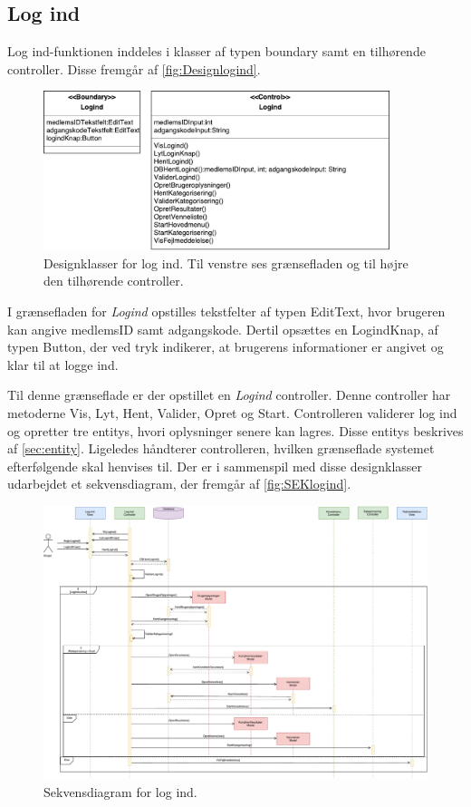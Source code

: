 \subsection*{Log ind}
Log ind-funktionen inddeles i klasser af typen boundary samt en tilhørende controller. Disse fremgår af \autoref{fig:Designlogind}. 

\begin{figure} [H]
\centering
\includegraphics[width=0.9\textwidth]{figures/MVC/MVCLogInd}
\caption{Designklasser for log ind. Til venstre ses grænsefladen og til højre den tilhørende controller.}
\label{fig:Designlogind}
\end{figure}

\noindent
I grænsefladen for \textit{Logind} opstilles tekstfelter af typen EditText, hvor brugeren kan angive medlemsID samt adgangskode. Dertil opsættes en LogindKnap, af typen Button, der ved tryk indikerer, at brugerens informationer er angivet og klar til at logge ind. 

Til denne grænseflade er der opstillet en \textit{Logind} controller. Denne controller har metoderne Vis, Lyt, Hent, Valider, Opret og Start. Controlleren validerer log ind og opretter tre entitys, hvori oplysninger senere kan lagres. Disse entitys beskrives af \autoref{sec:entity}. Ligeledes håndterer controlleren, hvilken grænseflade systemet efterfølgende skal henvises til. Der er i sammenspil med disse designklasser udarbejdet et sekvensdiagram, der fremgår af \autoref{fig:SEKlogind}.

\begin{figure} [H]
\centering
\includegraphics[width=1.5\textwidth, angle=90]{figures/Sek/SEKLogInd}
\caption{Sekvensdiagram for log ind.}
\label{fig:SEKlogind}
\end{figure}

